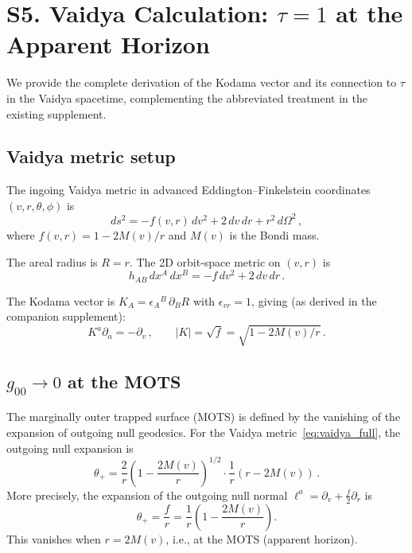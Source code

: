 \documentclass[aps,prd,preprint,superscriptaddress,longbibliography]{revtex4-2}
\newcommand{\tauasym}{\tau}
\begin{document}
\section{S5. Vaidya Calculation: \texorpdfstring{$\tauasym = 1$}{tau = 1} at the Apparent Horizon}
\label{sec:vaidya}

We provide the complete derivation of the Kodama vector and its
connection to $\tauasym$ in the Vaidya spacetime, complementing the
abbreviated treatment in the existing supplement.

\subsection{Vaidya metric setup}

The ingoing Vaidya metric in advanced Eddington--Finkelstein
coordinates $(v,r,\theta,\phi)$ is
\begin{equation}
  ds^2 = -f(v,r)\,dv^2 + 2\,dv\,dr + r^2\,d\Omega^2\,,
  \label{eq:vaidya_full}
\end{equation}
where $f(v,r) = 1 - 2M(v)/r$ and $M(v)$ is the Bondi mass.

The areal radius is $R = r$.  The 2D orbit-space metric on $(v,r)$ is
\begin{equation}
  h_{AB}\,dx^A\,dx^B = -f\,dv^2 + 2\,dv\,dr\,.
  \label{eq:h2d_full}
\end{equation}

The Kodama vector is $K_A = \epsilon_A{}^B\,\partial_B R$ with
$\epsilon_{vr} = 1$, giving (as derived in the companion supplement):
\begin{equation}
  K^a\partial_a = -\partial_v\,,\qquad |K| = \sqrt{f} = \sqrt{1 - 2M(v)/r}\,.
  \label{eq:Kodama_result}
\end{equation}

\subsection{$g_{00} \to 0$ at the MOTS}

The marginally outer trapped surface (MOTS) is defined by the
vanishing of the expansion of outgoing null geodesics.  For the Vaidya
metric~\eqref{eq:vaidya_full}, the outgoing null expansion is
\begin{equation}
  \theta_+ = \frac{2}{r}\left(1 - \frac{2M(v)}{r}\right)^{1/2}
  \cdot\frac{1}{r}\left(r - 2M(v)\right)\,.
  \label{eq:theta_plus}
\end{equation}
More precisely, the expansion of the outgoing null normal
$\ell^a = \partial_v + \frac{f}{2}\partial_r$ is
\begin{equation}
  \theta_+ = \frac{f}{r} = \frac{1}{r}\left(1 - \frac{2M(v)}{r}\right).
  \label{eq:theta_plus_simple}
\end{equation}
This vanishes when $r = 2M(v)$, i.e., at the MOTS (apparent horizon).
\end{document}
